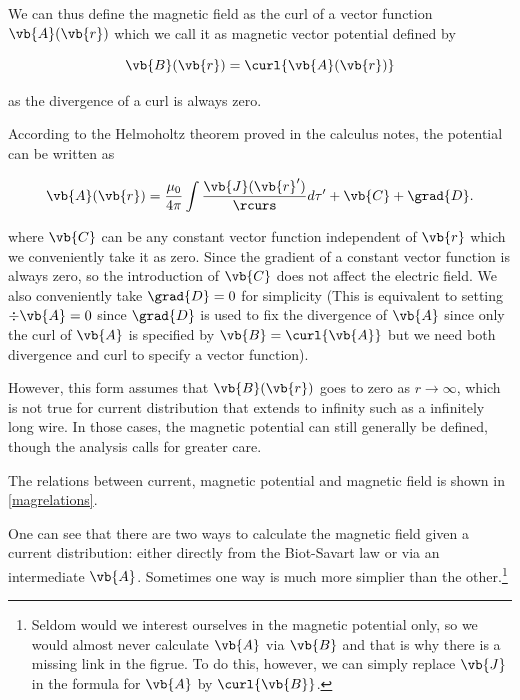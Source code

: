 \documentclass[english,a4paper,12pt]{report}
\begin{document}
We can thus define the magnetic field as the curl of a vector function \(\vb{A} (\vb{r} )\) which we call it as magnetic vector potential defined by 

\begin{equation}
    \vb{B} (\vb{r} ) = \curl{\vb{A} (\vb{r} )} 
\end{equation}

as the divergence of a curl is always zero.

According to the Helmoholtz theorem proved in the calculus notes, the potential can be written as  

\begin{equation}
    \vb{A} (\vb{r} ) = \frac{\mu_0}{4\pi} \int \frac{\vb{J} (\vb{r} ')}{\rcurs }d\tau ' + \vb{C} + \grad{D} . \label{magpotential} 
\end{equation}

where \(\vb{C} \) can be any constant vector function independent of \(\vb{r} \)  which we conveniently take it as zero. Since the gradient of a constant vector function is always zero, so the introduction of \(\vb{C} \) does not affect the electric field. We also conveniently take \(\grad{D} = 0\) for simplicity (This is equivalent to setting \(\div{\vb{A} } = 0 \) since \(\grad{D} \) is used to fix the divergence of \(\vb{A} \) since only the curl of \(\vb{A} \) is specified by \(\vb{B} = \curl{\vb{A} } \) but we need both divergence and curl to specify a vector function).  

However, this form assumes that \(\vb{B} (\vb{r} )\) goes to zero as \(r \to \infty\), which is not true for current distribution that extends to infinity such as a infinitely long wire. In those cases, the magnetic potential can still generally be defined, though the analysis calls for greater care.  

The relations between current, magnetic potential and magnetic field is shown in \cref{magrelations}. 


One can see that there are two ways to calculate the magnetic field given a current distribution: either directly from the Biot-Savart law or via an intermediate \(\vb{A} \). Sometimes one way is much more simplier than the other.\footnote{Seldom would we interest ourselves in the magnetic potential only, so we would almost never calculate \(\vb{A} \) via \(\vb{B} \) and that is why there is a missing link in the figrue. To do this, however, we can simply replace \(\vb{J} \) in the formula for \(\vb{A} \) by \(\curl{\vb{B} } \).} 
\end{document}
